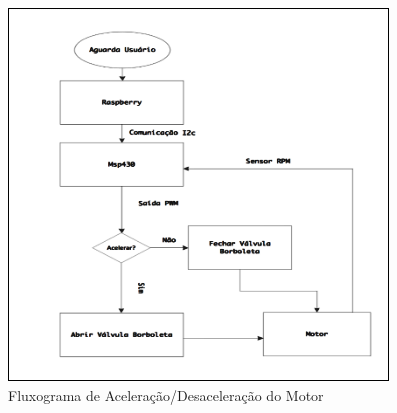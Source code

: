 \begin{figure}[h!]
	\centering
	\includegraphics[keepaspectratio=true,scale= 1.5]{figuras/fluxograma2.PNG}
	\caption{ Fluxograma de Aceleração/Desaceleração do Motor}
	\label{ Fluxograma de Aceleração/Desaceleração do Motor}
\end{figure}
